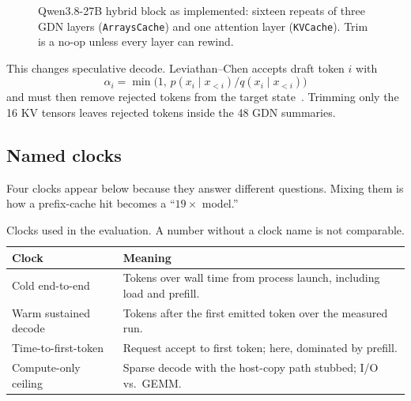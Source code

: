 \documentclass[11pt]{article}
\theoremstyle{definition}
\begin{document}
\begin{figure}[t]
\centering
{}
\caption{Qwen3.8-27B hybrid block as implemented: sixteen repeats of three GDN layers (\texttt{ArraysCache}) and one attention layer (\texttt{KVCache}). Trim is a no-op unless every layer can rewind.}
\label{fig:hybrid}
\end{figure}

This changes speculative decode. Leviathan--Chen accepts draft token $i$ with
\begin{equation}
\alpha_i = \min\bigl(1,\, p(x_i\mid x_{<i}) / q(x_i\mid x_{<i})\bigr)
\label{eq:alpha}
\end{equation}
and must then remove rejected tokens from the target state~\citep{leviathan2023speculative,chen2023accelerating}. Trimming only the 16 KV tensors leaves rejected tokens inside the 48 GDN summaries.

\subsection{Named clocks}
\label{sec:clocks}

Four clocks appear below because they answer different questions. Mixing them is how a prefix-cache hit becomes a ``$19{\times}$ model.''

\begin{table}[t]
\centering
\caption{Clocks used in the evaluation. A number without a clock name is not comparable.}
\label{tab:clocks}
\small
\begin{tabular}{@{}p{3.6cm}p{10.2cm}@{}}
\toprule
Clock & Meaning \\
\midrule
Cold end-to-end & Tokens over wall time from process launch, including load and prefill. \\
Warm sustained decode & Tokens after the first emitted token over the measured run. \\
Time-to-first-token & Request accept to first token; here, dominated by prefill. \\
Compute-only ceiling & Sparse decode with the host-copy path stubbed; I/O vs.\ GEMM. \\
\bottomrule
\end{tabular}
\end{table}
\end{document}
